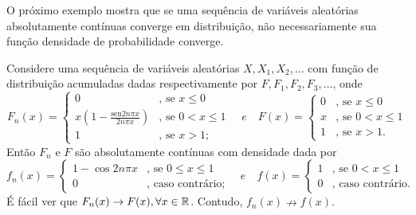 \begin{frame}
%
O próximo exemplo mostra que se uma sequência de variáveis aleatórias absolutamente contínuas converge em distribuição, não necessariamente sua função densidade de probabilidade converge.
%
\begin{exem}
Considere uma sequência de variáveis aleatórias $X,X_1,X_2,\ldots$ com função de distribuição acumuladas dadas respectivamente por $F,F_1,F_2,F_3,\ldots$, onde
$$
F_n(x)=\left\{
\begin{array}{cc}
0 & \mbox{, se $x\leq 0$} \\
x(1-\frac{\mbox{sen}2n\pi x}{2n\pi x}) & \mbox{, se $0<x\leq 1$} \\
1 & \mbox{, se $x> 1$};
\end{array}
\right.
\quad 
e
\quad 
F(x)=\left\{
\begin{array}{cc}
0 & \mbox{, se $x\leq 0$} \\
x & \mbox{, se $0<x\leq 1$} \\
1 & \mbox{, se $x> 1$}.
\end{array}
\right.
$$
%
%
%
Então $F_n$ e $F$ são absolutamente contínuas com densidade dada por
$$
f_n(x)=\left\{
\begin{array}{cc}
1-\cos 2n\pi x & \mbox{, se $0\leq x\leq 1$} \\
0 & \mbox{, caso contrário};
\end{array}
\right.
\quad e \quad
f(x)=\left\{
\begin{array}{cc}
1 & \mbox{, se $0<x\leq 1$} \\
0 & \mbox{, caso contrário}.
\end{array}
\right.
$$
É fácil ver que $F_n(x)\rightarrow F(x),\forall x\in\mathbb{R}$. Contudo, $f_n(x)\nrightarrow f(x)$.
\end{exem}
%
\end{frame}
%
